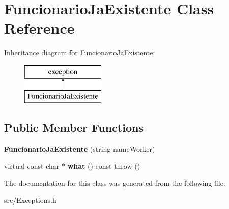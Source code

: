 \hypertarget{class_funcionario_ja_existente}{}\section{Funcionario\+Ja\+Existente Class Reference}
\label{class_funcionario_ja_existente}
Inheritance diagram for Funcionario\+Ja\+Existente\+:\begin{figure}[H]
\begin{center}
\leavevmode
\includegraphics[height=2.000000cm]{class_funcionario_ja_existente}
\end{center}
\end{figure}
\subsection*{Public Member Functions}
\begin{DoxyCompactItemize}
\item 
\hypertarget{class_funcionario_ja_existente_ab9cbab1b79c5d63e996347be33521c41}{}{\bfseries Funcionario\+Ja\+Existente} (string name\+Worker)\label{class_funcionario_ja_existente_ab9cbab1b79c5d63e996347be33521c41}

\item 
\hypertarget{class_funcionario_ja_existente_a4a952853cf5e806fac06b7b08ed623f5}{}virtual const char $\ast$ {\bfseries what} () const   throw ()\label{class_funcionario_ja_existente_a4a952853cf5e806fac06b7b08ed623f5}

\end{DoxyCompactItemize}


The documentation for this class was generated from the following file\+:\begin{DoxyCompactItemize}
\item 
src/Exceptions.\+h\end{DoxyCompactItemize}

